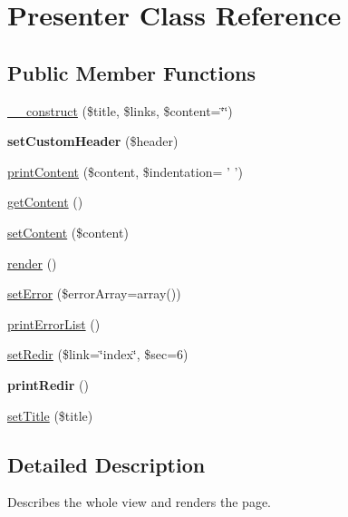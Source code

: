 \hypertarget{classPresenter}{\section{Presenter Class Reference}
\label{classPresenter}
}
\subsection*{Public Member Functions}
\begin{DoxyCompactItemize}
\item 
\hyperlink{classPresenter_a364fc50678030d816f515223be72b23a}{\+\_\+\+\_\+construct} (\$title, \$links, \$content=\char`\"{}\char`\"{})
\item 
\hypertarget{classPresenter_a299e31916fc252227e369fc5efad77f9}{{\bfseries set\+Custom\+Header} (\$header)}\label{classPresenter_a299e31916fc252227e369fc5efad77f9}

\item 
\hyperlink{classPresenter_a327ab1b725813be28114753935b42cd4}{print\+Content} (\$content, \$indentation= ' ')
\item 
\hyperlink{classPresenter_a8a9d11db6633e0ebb898abd4580f8988}{get\+Content} ()
\item 
\hyperlink{classPresenter_a9a7d0d294934548d13620baca0657087}{set\+Content} (\$content)
\item 
\hyperlink{classPresenter_a2194a46cf6c23dd4e483f1ee63bc2236}{render} ()
\item 
\hyperlink{classPresenter_a1d66815ed950c7362a9c87bbcc6d9b7b}{set\+Error} (\$error\+Array=array())
\item 
\hyperlink{classPresenter_a5e4fe61038c5535719c6d7bc3b557019}{print\+Error\+List} ()
\item 
\hyperlink{classPresenter_a7dffb86806a017ebd3e13ca331c6f15a}{set\+Redir} (\$link=\char`\"{}index\char`\"{}, \$sec=6)
\item 
\hypertarget{classPresenter_ace2a8a72ee53e6be953614d00e29f741}{{\bfseries print\+Redir} ()}\label{classPresenter_ace2a8a72ee53e6be953614d00e29f741}

\item 
\hyperlink{classPresenter_a80cf6f790c8705d20632f7e3a73947fe}{set\+Title} (\$title)
\end{DoxyCompactItemize}


\subsection{Detailed Description}
Describes the whole view and renders the page.

